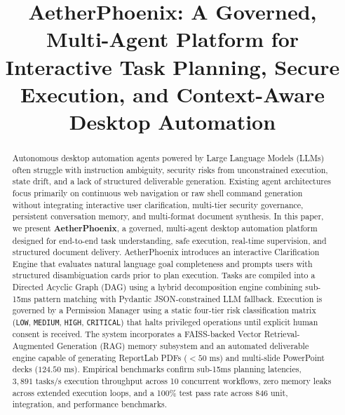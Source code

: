 \documentclass[conference]{IEEEtran}
\begin{document}
\title{AetherPhoenix: A Governed, Multi-Agent Platform for Interactive Task Planning, Secure Execution, and Context-Aware Desktop Automation}

\author{
}

\maketitle

\begin{abstract}
Autonomous desktop automation agents powered by Large Language Models (LLMs) often struggle with instruction ambiguity, security risks from unconstrained execution, state drift, and a lack of structured deliverable generation. Existing agent architectures focus primarily on continuous web navigation or raw shell command generation without integrating interactive user clarification, multi-tier security governance, persistent conversation memory, and multi-format document synthesis. In this paper, we present \textbf{AetherPhoenix}, a governed, multi-agent desktop automation platform designed for end-to-end task understanding, safe execution, real-time supervision, and structured document delivery. AetherPhoenix introduces an interactive Clarification Engine that evaluates natural language goal completeness and prompts users with structured disambiguation cards prior to plan execution. Tasks are compiled into a Directed Acyclic Graph (DAG) using a hybrid decomposition engine combining sub-15ms pattern matching with Pydantic JSON-constrained LLM fallback. Execution is governed by a Permission Manager using a static four-tier risk classification matrix (\texttt{LOW}, \texttt{MEDIUM}, \texttt{HIGH}, \texttt{CRITICAL}) that halts privileged operations until explicit human consent is received. The system incorporates a FAISS-backed Vector Retrieval-Augmented Generation (RAG) memory subsystem and an automated deliverable engine capable of generating ReportLab PDFs ($<50\text{ ms}$) and multi-slide PowerPoint decks ($124.50\text{ ms}$). Empirical benchmarks confirm sub-15ms planning latencies, $3,891\text{ tasks/s}$ execution throughput across 10 concurrent workflows, zero memory leaks across extended execution loops, and a 100\% test pass rate across 846 unit, integration, and performance benchmarks.
\end{abstract}
\end{document}

